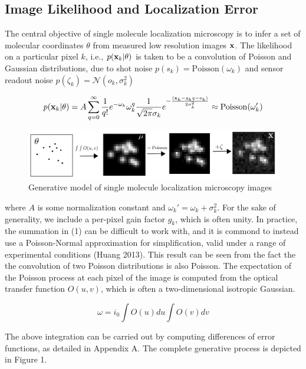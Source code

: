\documentclass{article}
\begin{document}
\subsection{Image Likelihood and Localization Error}

The central objective of single molecule localization microscopy is to infer a set of molecular coordinates $\theta$ from measured low resolution images $\bold{x}$. The likelihood on a particular pixel $k$, i.e., $p(\bold{x}_k|\theta)$ is taken to be a convolution of Poisson and Gaussian distributions, due to shot noise $p(s_{k}) = \mathrm{Poisson}(\omega_{k})$ and sensor readout noise $p(\zeta_{k}) = \mathcal{N}(o_{k},\sigma_{k}^{2})$ 

\begin{equation}
p(\bold{x}_{k}|\theta) = A\sum_{q=0}^{\infty} \frac{1}{q!}e^{-\omega_{k}}\omega_{k}^{q}\frac{1}{\sqrt{2\pi}\sigma_{k}}e^{-\frac{(\bold{x}_{k}-g_{k}q-o_{k})}{2\sigma_{k}^{2}}} \approx \mathrm{Poisson}(\omega_{k}')
\end{equation}


\begin{figure}
\includegraphics[scale=0.65]{Generation-Figure.png}
\caption{Generative model of single molecule localization microscopy images}
\end{figure}

where $A$ is some normalization constant and $\omega_{k}' = \omega_{k} + \sigma_{k}^{2}$. For the sake of generality, we include a per-pixel gain factor $g_{k}$, which is often unity. In practice, the summation in (1) can be difficult to work with, and it is commond to instead use a Poisson-Normal approximation for simplification, valid under a range of experimental conditions (Huang 2013). This result can be seen from the fact the the convolution of two Poisson distributions is also Poisson. The expectation of the Poisson process at each pixel of the image is computed from the optical transfer function $O(u,v)$, which is often a two-dimensional isotropic Gaussian.

\begin{equation}
\omega = i_{0}\int O(u)du\int O(v)dv
\end{equation}

The above integration can be carried out by computing differences of error functions, as detailed in Appendix A. The complete generative process is depicted in Figure 1. 
\end{document}
